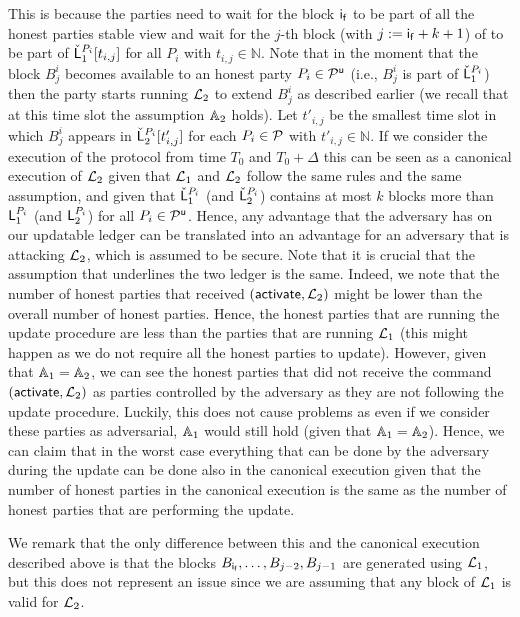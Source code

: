 This is because the parties need to wait for the block $\mathsf{i_f}$ to be part of all the honest parties stable view
and wait for the $j$-th block (with $j:=\mathsf{i_f}+k+1$) of to be part of $\check {\mathsf{L}}_1^{P_i}[t_{i,j}]$  for all $P_i$ with $t_{i,j}\in\mathbb{N}$. 
Note that in the moment that the block $B^i_{j}$ becomes available to an honest party $P_i\in\mathcal{P}^\mathsf{u}$ (i.e., $B^i_{j}$ is part of $\check {\mathsf{L}}_1^{P_i}$) then the party starts running $\mathcal{L}_2$ to extend $B^i_{j}$ as described earlier (we recall that at this time slot the assumption $\mathbb{A}_2$ holds).
Let $t'_{i,j}$ be the smallest time slot in which $B^i_{j}$ appears in $\check {\mathsf{L}}_2^{P_i}[t'_{i,j}]$
 for each $P_i\in\mathcal{P}$ with $t'_{i,j}\in\mathbb{N}$. 
If we consider the execution of the protocol from time $T_0$ and $T_0+\Delta$ this can be seen as a canonical execution of $\mathcal{L}_2$ given that $\mathcal{L}_1$ and $\mathcal{L}_2$ follow the same rules 
and the same assumption, and given that $\check {\mathsf{L}}_1^{P_i}$ (and $\check {\mathsf{L}}_2^{P_i}$) contains at most $k$ blocks 
more than $\mathsf{L}_1^{P_i}$ (and $\mathsf{L}_2^{P_i}$) for all $P_i\in\mathcal{P}^\mathsf{u}$. Hence, any advantage that the adversary has on our updatable ledger can be translated into an advantage for an adversary that is attacking $\mathcal{L}_2$, which is assumed to be secure.
Note that it is crucial that the assumption that underlines the two ledger is the same. Indeed, we note that the
number of honest parties that received $(\mathsf{activate}, \mathcal{L}_2)$ might be lower than the overall number of honest parties. Hence, the honest parties that are running the update procedure are less than the parties that are running $\mathcal{L}_1$ (this might happen as we do not require all the honest parties to update). However, given that 
$\mathbb{A}_1=\mathbb{A}_2$, we can see the honest parties that did not receive the command $(\mathsf{activate},\mathcal{L}_2)$
as parties controlled by the adversary as they are not following the update procedure. Luckily, this does not
cause problems as even if we consider these parties as adversarial, $\mathbb{A}_1$ would still hold  
(given that $\mathbb{A}_1=\mathbb{A}_2$). Hence, we can claim that in the worst case everything that can be done by the adversary during the update can be done also in the canonical execution given that the number of honest parties
in the canonical execution is the same as the number of honest parties that are performing the update.

We remark that the only difference between this and the canonical execution described above is
that the blocks $B_{\mathsf{i_f}},\dots, B_{j-2}, B_{j-1}$  are generated using $\mathcal{L}_1$, but this does not represent an issue since we are assuming that any block of $\mathcal{L}_1$ is valid for $\mathcal{L}_2$.